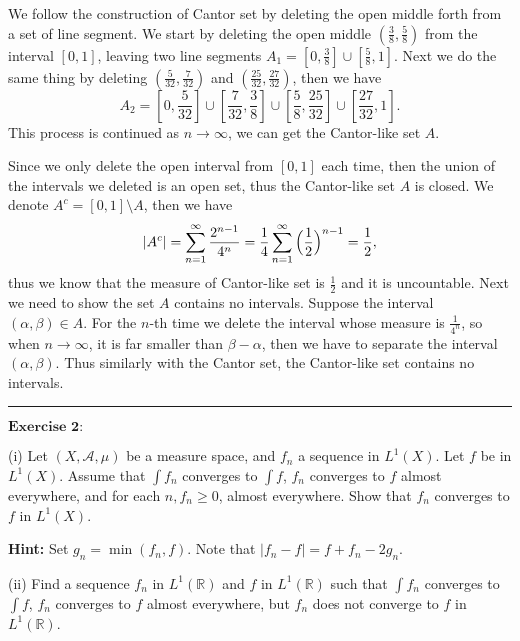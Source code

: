 \documentclass[12pt]{article}
\begin{document}
We follow the construction of Cantor set by deleting the open middle forth from a set of line segment. We start by deleting the open middle $(\frac{3}{8}, \frac{5}{8})$ from the interval $[0, 1]$, leaving two line segments $A_{1} = [0, \frac{3}{8}] \cup [\frac{5}{8}, 1]$. Next we do the same thing by deleting $(\frac{5}{32}, \frac{7}{32})$ and $(\frac{25}{32}, \frac{27}{32})$, then we have
\begin{equation*}
    A_{2} = [0, \frac{5}{32}] \cup [\frac{7}{32}, \frac{3}{8}] \cup [\frac{5}{8}, \frac{25}{32}] \cup [\frac{27}{32}, 1].
\end{equation*}
This process is continued as $n \to \infty$, we can get the Cantor-like set $A$.

Since we only delete the open interval from $[0, 1]$ each time, then the union of the intervals we deleted is an open set, thus the Cantor-like set $A$ is closed. We denote $A^{c} = [0, 1] \setminus A$, then we have
\begin{equation*}
    |A^{c}| = \sum_{n = 1}^{\infty} \frac{2^{n-1}}{4^{n}} = \frac{1}{4}  \sum_{n = 1}^{\infty} \Big{(} \frac{1}{2} \Big{)}^{n -1} = \frac{1}{2},
\end{equation*}
thus we know that the measure of Cantor-like set is $\frac{1}{2}$ and it is uncountable. Next we need to show the set $A$ contains no intervals. Suppose the interval $(\alpha, \beta) \in A$. For the $n$-th time we delete the interval whose measure is $\frac{1}{4^{n}}$, so when $n \to \infty$, it is far smaller than $\beta - \alpha$, then we have to separate the interval $(\alpha, \beta)$. Thus similarly with the Cantor set, the Cantor-like set contains no intervals. 


\noindent\rule[0.25\baselineskip]{\textwidth}{0.5pt}

\vspace{8pt}

$\textbf{Exercise 2:}$

(i) Let $(X, \mathcal{A}, \mu)$ be a measure space, and $f_{n}$ a sequence in $L^{1}(X)$. Let $f$ be in $L^{1}(X)$. Assume that $\int f_{n}$ converges to $\int f$, $f_{n}$ converges to $f$ almost everywhere, and for each $n, f_{n} \geq 0$, almost everywhere. Show that $f_{n}$ converges to $f$ in $L^{1}(X)$.

\textbf{Hint:} Set $g_{n} = \min(f_{n}, f)$. Note that $|f_{n} - f| = f + f_{n} - 2 g_{n}$.

(ii) Find a sequence $f_{n}$ in $L^{1}(\mathbb{R})$ and $f$ in $L^{1}(\mathbb{R})$ such that $\int f_{n}$ converges to $\int f$, $f_{n}$ converges to $f$ almost everywhere, but $f_{n}$ does not converge to $f$ in $L^{1}(\mathbb{R})$.
 
\end{document}
